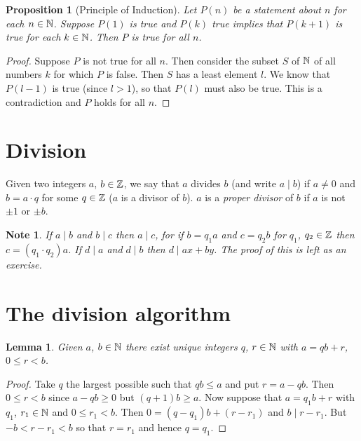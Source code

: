 \documentclass{notes}
\theoremstyle{plain}
\newtheorem{lemma}{Lemma}[chapter]
\newtheorem*{proposition}{Proposition}
\newtheorem*{note}{Note}
\begin{document}
\begin{proposition}[Principle of Induction]
Let $P(n)$ be a statement about $n$ for each $n \in \mathbb{N}$.  Suppose
$P(1)$ is true and $P(k)$ true implies that $P(k+1)$ is true for each
$k \in \mathbb{N}$.  Then $P$ is true for all $n$.
\end{proposition}

\begin{proof}
Suppose $P$ is not true for all $n$.  Then consider the subset $S$ of
$\mathbb{N}$ of all numbers $k$ for which $P$ is false. Then $S$ has a least
element $l$.  We know that $P(l-1)$ is true (since $l > 1$), so that
$P(l)$ must also be true.  This is a contradiction and $P$ holds for
all $n$.
\end{proof}

\section{Division}

Given two integers $a$, $b \in \mathbb{Z}$, we say that $a$ divides $b$
(and write $a \mid b$) if $a \neq 0$ and $b = a \cdot q$ for some $q \in \mathbb{Z}$
($a$ is a divisor of $b$). $a$ is a \emph{proper divisor} of $b$ if
$a$ is not $\pm 1$ or $\pm b$.

\begin{note}
If $a \mid b$ and $b \mid c$ then $a \mid c$, for if $b = q_1 a$
and $c = q_2 b$ for $q_1$, $q_2 \in \mathbb{Z}$ then $c = (q_1 \cdot q_2) a$.
If $d \mid a$ and $d \mid b$ then $d \mid ax + by$.  The proof of this is
left as an exercise.
\end{note}

\section{The division algorithm}

\begin{lemma}\label{L:divalg}
Given $a$, $b \in \mathbb{N}$ there exist unique integers $q$, $r \in \mathbb{N}$ with
$a = q b + r$, $0 \le r < b$.
\end{lemma}

\begin{proof}
Take $q$ the largest possible such that $q b \le a$ and put $r = a - q b$.
Then $0 \le r < b$ since $a - qb \ge 0$ but $(q+1) b \ge a$.  Now suppose
that $a = q_1 b + r$ with $q_1$, $r_1 \in \mathbb{N}$ and $0 \le r_1 < b$.  Then
$0 = (q - q_1) b + (r - r_1)$ and $b \mid r - r_1$.  But
$-b < r - r_1 < b$ so that $r = r_1$ and hence $q = q_1$.
\end{proof}
\end{document}
